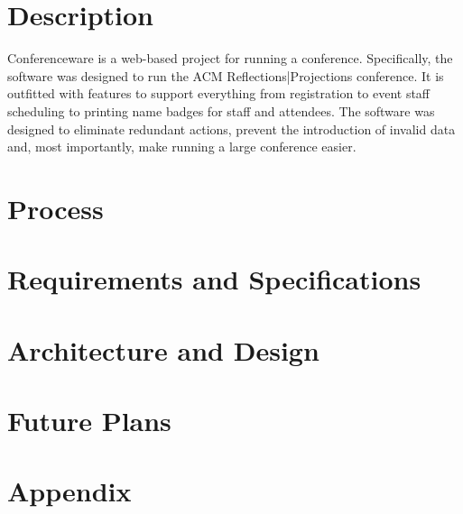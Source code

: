 \documentclass{article}
\begin{document}
\part{Description}
Conferenceware is a web-based project for running a conference. Specifically, the software was designed to run the ACM Reflections|Projections conference. It is outfitted with features to support everything from registration to event staff scheduling to printing name badges for staff and attendees.  The software was designed to eliminate redundant actions, prevent the introduction of invalid data and, most importantly, make running a large conference easier.

\part{Process}

\part{Requirements and Specifications}

\part{Architecture and Design}

\part{Future Plans}

\part{Appendix}
\end{document}
